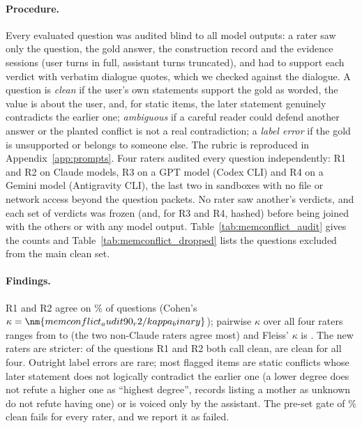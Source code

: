 \paragraph{Procedure.}
Every evaluated question was audited blind to all model outputs: a rater saw only the question, the gold answer, the construction record and the evidence sessions (user turns in full, assistant turns truncated), and had to support each verdict with verbatim dialogue quotes, which we checked against the dialogue. A question is \emph{clean} if the user's own statements support the gold as worded, the value is about the user, and, for static items, the later statement genuinely contradicts the earlier one; \emph{ambiguous} if a careful reader could defend another answer or the planted conflict is not a real contradiction; a \emph{label error} if the gold is unsupported or belongs to someone else. The rubric is reproduced in Appendix~\ref{app:prompts}. Four raters audited every question independently: R1 and R2 on Claude models, R3 on a GPT model (Codex CLI) and R4 on a Gemini model (Antigravity CLI), the last two in sandboxes with no file or network access beyond the question packets. No rater saw another's verdicts, and each set of verdicts was frozen (and, for R3 and R4, hashed) before being joined with the others or with any model output. Table~\ref{tab:memconflict_audit} gives the counts and Table~\ref{tab:memconflict_dropped} lists the questions excluded from the main clean set.

\paragraph{Findings.}
R1 and R2 agree on \% of questions (Cohen's $\kappa=\nm{memconflict_audit90_r2/kappa_binary}$); pairwise $\kappa$ over all four raters ranges from  to  (the two non-Claude raters agree most) and Fleiss' $\kappa$ is . The new raters are stricter: of the  questions R1 and R2 both call clean,  are clean for all four. Outright label errors are rare; most flagged items are static conflicts whose later statement does not logically contradict the earlier one (a lower degree does not refute a higher one as ``highest degree'', records listing a mother as unknown do not refute having one) or is voiced only by the assistant. The pre-set gate of \% clean fails for every rater, and we report it as failed.

